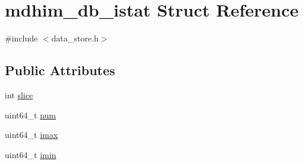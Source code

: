 \hypertarget{structmdhim__db__istat}{\section{mdhim\-\_\-db\-\_\-istat Struct Reference}
\label{structmdhim__db__istat}
}


{\ttfamily \#include $<$data\-\_\-store.\-h$>$}

\subsection*{Public Attributes}
\begin{DoxyCompactItemize}
\item 
int \hyperlink{structmdhim__db__istat_aa478e3ac191e0899e25f312d8aa33b41}{slice}
\item 
uint64\-\_\-t \hyperlink{structmdhim__db__istat_a18e1713a8ca30875d6cd914b11e8a70e}{num}
\item 
uint64\-\_\-t \hyperlink{structmdhim__db__istat_a9e6b79101a083afc00c3ccc47cfc96d6}{imax}
\item 
uint64\-\_\-t \hyperlink{structmdhim__db__istat_a6b2cfaa0eab14f94924d79c8b722aad8}{imin}
\end{DoxyCompactItemize}


